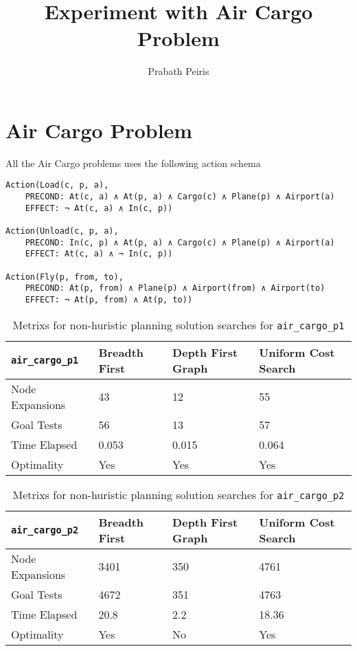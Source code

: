 \documentclass{article}
\begin{document}
\author{Prabath Peiris}
\date{}
\title{Experiment with Air Cargo Problem}
\maketitle

\section*{Air Cargo Problem}

All the Air Cargo problems uses the following action schema

\begin{verbatim}
Action(Load(c, p, a),
	PRECOND: At(c, a) ∧ At(p, a) ∧ Cargo(c) ∧ Plane(p) ∧ Airport(a)
	EFFECT: ¬ At(c, a) ∧ In(c, p))

Action(Unload(c, p, a),
	PRECOND: In(c, p) ∧ At(p, a) ∧ Cargo(c) ∧ Plane(p) ∧ Airport(a)
	EFFECT: At(c, a) ∧ ¬ In(c, p))

Action(Fly(p, from, to),
	PRECOND: At(p, from) ∧ Plane(p) ∧ Airport(from) ∧ Airport(to)
	EFFECT: ¬ At(p, from) ∧ At(p, to))
\end{verbatim}

\begin{table}[h]
\begin{center}
\begin{tabular}{|l|l|l|l|}
\hline
{\tt air\_cargo\_p1} & Breadth First & Depth First Graph& Uniform Cost Search \\ \hline\hline
Node Expansions& 43 & 12 & 55\\ 
Goal Tests & 56 & 13 & 57\\ 
Time Elapsed& 0.053 & 0.015 & 0.064\\ 
Optimality & Yes & Yes & Yes\\ \hline
\end{tabular}
\end{center}
\caption{Metrixs for non-huristic planning solution searches for {\tt air\_cargo\_p1}}
\end{table}

\begin{table}[h]
\begin{center}
\begin{tabular}{|l|l|l|l|}
\hline
{\tt air\_cargo\_p2} & Breadth First & Depth First Graph& Uniform Cost Search \\ \hline\hline
Node Expansions& 3401  & 350 &4761 \\ 
Goal Tests & 4672 & 351 & 4763\\ 
Time Elapsed& 20.8 & 2.2 & 18.36\\ 
Optimality & Yes & No & Yes\\ \hline
\end{tabular}
\end{center}
\caption{Metrixs for non-huristic planning solution searches for {\tt air\_cargo\_p2}}
\end{table}
\end{document}
